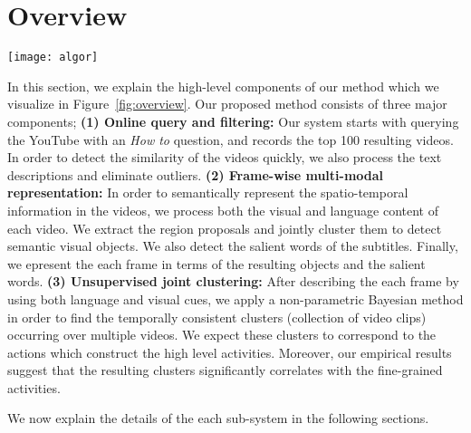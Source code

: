\section{Overview}
\label{sec:overview}
\begin{figure*}[t]
  \texttt{[image: algor]}
  \caption{Components of our recipe understanding method. \textbf{Query:} We query the YouTube for top 100 \emph{How To} videos and filter the outliers; \textbf{Framewise Representation:} We automatically extract object clusters and salient word in order to find multi-modal representation of each frame. \textbf{Unsupervised Activity Detection:} We jointly cluster videos in order to learn activities/steps related to the recipe.}
\label{fig:overview}
\end{figure*}

In this section, we explain the high-level components of our method which we visualize in Figure~\ref{fig:overview}. Our proposed method consists of three major components; \textbf{(1) Online query and filtering:} Our system starts with querying the YouTube with an \emph{How to} question, and records the top 100 resulting videos. In order to detect the similarity of the videos quickly, we also process the text descriptions and eliminate outliers. \textbf{(2) Frame-wise multi-modal representation:} In order to semantically represent the spatio-temporal information in the videos, we process both the visual and language content of each video. We extract the region proposals and jointly cluster them to detect semantic visual objects. We also detect the salient words of the subtitles. Finally, we epresent the each frame in terms of the resulting objects and the salient words. \textbf{(3) Unsupervised joint clustering:} After describing the each frame by using both language and visual cues, we apply a non-parametric Bayesian method in order to find the temporally consistent clusters (collection of video clips) occurring over multiple videos. We expect these clusters to correspond to the actions which construct the high level activities. Moreover, our empirical results suggest that the resulting clusters significantly correlates with the fine-grained activities.

We now explain the details of the each sub-system in the following sections.
